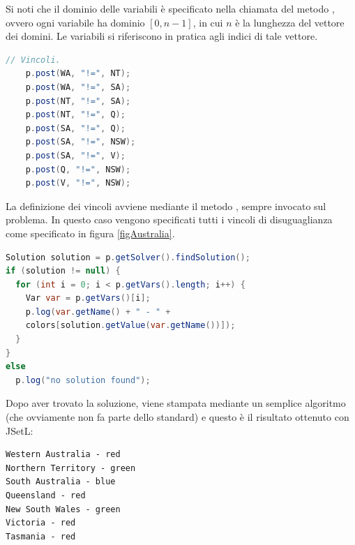 Si noti che il dominio delle variabili è specificato nella chiamata del metodo
, ovvero ogni variabile ha dominio $[0, n-1]$, in cui $n$ è
la lunghezza del vettore dei domini. Le variabili si riferiscono in pratica agli
indici di tale vettore.

\begin{lstlisting}[language=Java,
                   caption = {definizione dei vincoli.},
                   frame = shadowbox]
    // Vincoli.
    p.post(WA, "!=", NT);
    p.post(WA, "!=", SA);
    p.post(NT, "!=", SA);
    p.post(NT, "!=", Q);
    p.post(SA, "!=", Q);
    p.post(SA, "!=", NSW);
    p.post(SA, "!=", V);
    p.post(Q, "!=", NSW);
    p.post(V, "!=", NSW);
\end{lstlisting}
La definizione dei vincoli avviene mediante il metodo
, sempre invocato sul problema. In questo caso
vengono specificati tutti i vincoli di disuguaglianza come specificato in figura
\ref{figAustralia}.

\begin{lstlisting}[language=Java,
                   caption = {ricerca della soluzione.},
                   frame = shadowbox]
Solution solution = p.getSolver().findSolution();
if (solution != null) {
  for (int i = 0; i < p.getVars().length; i++) {
    Var var = p.getVars()[i];
    p.log(var.getName() + " - " +
    colors[solution.getValue(var.getName())]);
  }
}
else
  p.log("no solution found");
\end{lstlisting}
Dopo aver trovato la soluzione, viene stampata mediante
un semplice algoritmo (che ovviamente non fa parte dello standard) e questo è
il risultato ottenuto con JSetL:
\begin{lstlisting}[caption = {la soluzione.},
                   frame = shadowbox]
Western Australia - red
Northern Territory - green
South Australia - blue
Queensland - red
New South Wales - green
Victoria - red
Tasmania - red
\end{lstlisting}
